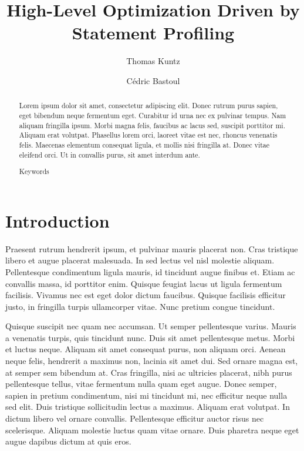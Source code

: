 \documentclass[runningheads,a4paper]{llncs}
\title{High-Level Optimization Driven by Statement Profiling}
\author{Thomas Kuntz \and Cédric Bastoul}
\institute{University of Strasbourg}
\newcommand{\keywords}[1]{\par\addvspace\baselineskip
\noindent\keywordname\enspace\ignorespaces#1}
\begin{document}
\maketitle

\begin{abstract}
Lorem ipsum dolor sit amet, consectetur adipiscing elit. Donec rutrum purus sapien, eget bibendum neque fermentum eget. Curabitur id urna nec ex pulvinar tempus. Nam aliquam fringilla ipsum. Morbi magna felis, faucibus ac lacus sed, suscipit porttitor mi. Aliquam erat volutpat. Phasellus lorem orci, laoreet vitae est nec, rhoncus venenatis felis. Maecenas elementum consequat ligula, et mollis nisi fringilla at. Donec vitae eleifend orci. Ut in convallis purus, sit amet interdum ante.

\keywords{Keywords}
\end{abstract}

\section{Introduction}
Praesent rutrum hendrerit ipsum, et pulvinar mauris placerat non. Cras tristique libero et augue placerat malesuada. In sed lectus vel nisl molestie aliquam. Pellentesque condimentum ligula mauris, id tincidunt augue finibus et. Etiam ac convallis massa, id porttitor enim. Quisque feugiat lacus ut ligula fermentum facilisis. Vivamus nec est eget dolor dictum faucibus. Quisque facilisis efficitur justo, in fringilla turpis ullamcorper vitae. Nunc pretium congue tincidunt.

Quisque suscipit nec quam nec accumsan. Ut semper pellentesque varius. Mauris a venenatis turpis, quis tincidunt nunc. Duis sit amet pellentesque metus. Morbi et luctus neque. Aliquam sit amet consequat purus, non aliquam orci. Aenean neque felis, hendrerit a maximus non, lacinia sit amet dui. Sed ornare magna est, at semper sem bibendum at. Cras fringilla, nisi ac ultricies placerat, nibh purus pellentesque tellus, vitae fermentum nulla quam eget augue. Donec semper, sapien in pretium condimentum, nisi mi tincidunt mi, nec efficitur neque nulla sed elit. Duis tristique sollicitudin lectus a maximus. Aliquam erat volutpat. In dictum libero vel ornare convallis. Pellentesque efficitur auctor risus nec scelerisque. Aliquam molestie luctus quam vitae ornare. Duis pharetra neque eget augue dapibus dictum at quis eros.
\end{document}
